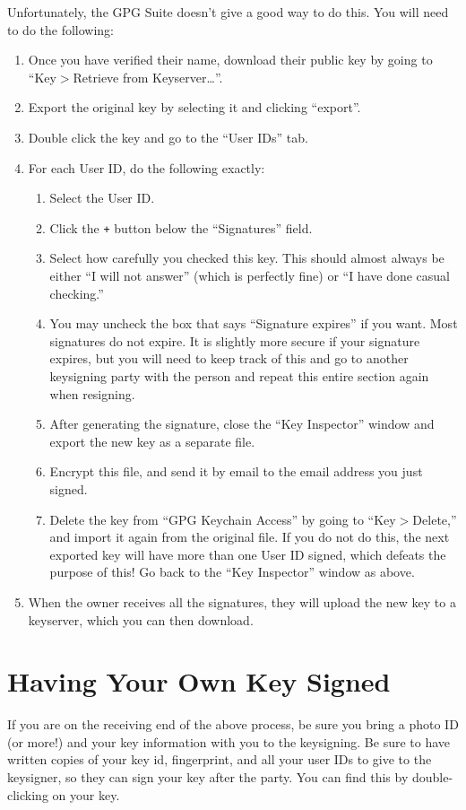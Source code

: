 \documentclass{article}
\begin{document}
Unfortunately, the GPG Suite doesn't give a good way to do this.  You
will need to do the following:

\begin{enumerate}
\item Once you have verified their name, download their public key by
  going to ``Key$>$Retrieve from Keyserver\dots''.
\item Export the original key by selecting it and clicking ``export''.
\item Double click the key and go to the ``User IDs'' tab.
\item For each User ID, do the following exactly:
  \begin{enumerate}
  \item Select the User ID.
  \item Click the \texttt{+} button below the ``Signatures'' field.
  \item Select how carefully you checked this key.  This should almost
    always be either ``I will not answer'' (which is perfectly fine)
    or ``I have done casual checking.''
  \item You may uncheck the box that says ``Signature expires'' if you
    want.  Most signatures do not expire.  It is slightly more secure
    if your signature expires, but you will need to keep track of this
    and go to another keysigning party with the person and repeat this
    entire section again when resigning.
  \item After generating the signature, close the ``Key Inspector''
    window and export the new key as a separate file.
  \item Encrypt this file, and send it by email to the email address
    you just signed.
  \item Delete the key from ``GPG Keychain Access'' by going to
    ``Key$>$Delete,'' and import it again from the original file.  If
    you do not do this, the next exported key will have more than one
    User ID signed, which defeats the purpose of this!  Go back to the
    ``Key Inspector'' window as above.
  \end{enumerate}
\item When the owner receives all the signatures, they will upload the
  new key to a keyserver, which you can then download.
\end{enumerate}

\section*{Having Your Own Key Signed}
If you are on the receiving end of the above process, be sure you
bring a photo ID (or more!) and your key information with you to the
keysigning.  Be sure to have written copies of your key id,
fingerprint, and all your user IDs to give to the keysigner, so they
can sign your key after the party.  You can find this by
double-clicking on your key.
\end{document}
